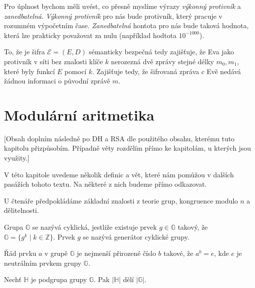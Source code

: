 \documentclass[
  program=infoi,
  biblatex,
  figures=false,
  glossaries,
  index
]{kidiplom}
\begin{document}
        Pro úplnost bychom měli uvést, co přesně myslíme výrazy \emph{výkonný protivník} a \emph{zanedbatelná}.
        \emph{Výkonný protivník} pro nás bude protivník, který pracuje v rozumném výpočetním čase.
        \emph{Zanedbatelná} hontota pro nás bude taková hodnota, která lze prakticky považovat za nulu (například hodtota $10^{-1000}$).


        To, že je šifra $\mathcal{E}  = (E, D)$ sémanticky bezpečná tedy zajišťuje, že Eva jako protivník v síti
        bez znalosti klíče $k$ nerozezná dvě zprávy stejné délky $m_0, m_1$, které byly funkcí $E$ pomocí $k$.
        Zajišťuje tedy, že šifrovaná zpráva $c$ Evě nedává žádnou informaci o původní zprávě $m$.


\section{Modulární aritmetika}\label{sec:modular-arithmetic}

    [Obsah doplním následně po DH a RSA dle použitého obsahu, kterému tuto kapitolu přizpůsobím.
    Případně věty rozdělím přímo ke kapitolám, u kterých jsou využity.]

    V této kapitole uvedeme několik definic a vět, které nám pomůžou v dalších pasážích tohoto textu.
    Na některé z nich budeme přímo odkazovat.
    
    U čtenáře předpokládáme základní znalosti z teorie grup, kongruence modulo $n$ a dělitelnosti.



    \begin{definition}
        Grupa $\mathbb{G}$ se nazývá cyklická, jestliže existuje prvek $g \in \mathbb{G}$ takový, že $\mathbb{G} =\{g^k \mid k \in \mathbb{Z}\}$.
        Prvek $g$ se nazývá generátor cyklické grupy.
    \end{definition}

    \begin{definition}
        Řád prvku $a$ v grupě $\mathbb{G}$ je nejmenší přirozené číslo $b$ takové, že $a^b = e$, kde $e$ je neutrálním prvkem grupy $\mathbb{G}$.
    \end{definition}


    \begin{theorem}
        
        Nechť $\mathbb{H}$ je podgrupa grupy $\mathbb{G}$. Pak $|\mathbb{H}|$ dělí $|\mathbb{G}|$.
    \end{theorem}
\end{document}
